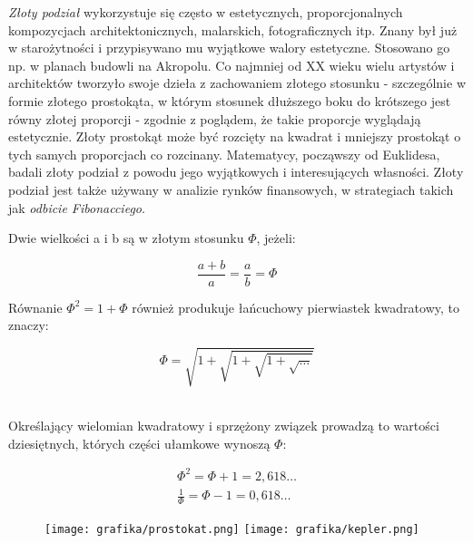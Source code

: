 \documentclass{article}
\begin{document}
\emph{Złoty podział} wykorzystuje się często w estetycznych, proporcjonalnych kompozycjach architektonicznych, malarskich, fotograficznych itp. Znany był już w starożytności i przypisywano mu wyjątkowe walory estetyczne. Stosowano go np. w planach budowli na Akropolu. Co najmniej od XX wieku wielu artystów i architektów tworzyło swoje dzieła z zachowaniem złotego stosunku - szczególnie w formie złotego prostokąta, w którym stosunek dłuższego boku do krótszego jest równy złotej proporcji - zgodnie z poglądem, że takie proporcje wyglądają estetycznie. Złoty prostokąt może być rozcięty na kwadrat i mniejszy prostokąt o tych samych proporcjach co rozcinany. Matematycy, począwszy od Euklidesa, badali złoty podział z powodu jego wyjątkowych i interesujących własności. Złoty podział jest także używany w analizie rynków finansowych, w strategiach takich jak \emph{odbicie Fibonacciego}.
\\
 \begin{center}Dwie wielkości a i b są w złotym stosunku $\Phi$, jeżeli:\end{center}
\begin{equation}
\frac{a+b}{a} = \frac{a}{b} = \Phi
\end{equation}
\begin{center} Równanie \begin{math} \Phi^{2} = 1 + \Phi \end{math} również produkuje łańcuchowy pierwiastek kwadratowy, to znaczy:\end{center}
\begin{equation}
\Phi = \sqrt{ 1+\sqrt{1+{\sqrt{1+{\sqrt{\ldots}}}}}}
\end{equation}
\\
\begin{center}Określający wielomian kwadratowy i sprzężony związek prowadzą to wartości dziesiętnych, których części ułamkowe wynoszą $\Phi$:\end{center}
\begin{eqnarray}
\Phi^{2} = \Phi + 1 = 2,618\ldots
\\
\frac{1}{\Phi} = \Phi - 1 = 0,618\ldots
\end{eqnarray}
\newpage
\begin{figure}
\centering
\texttt{[image: grafika/prostokat.png]}
\centering
\texttt{[image: grafika/kepler.png]}
\end{figure}
\end{document}
